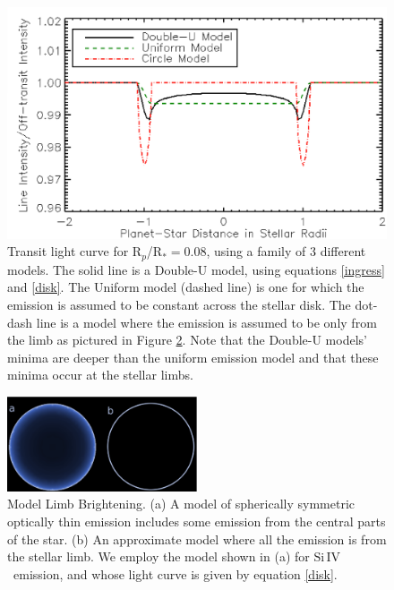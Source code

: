 \documentclass[manuscript]{aastex}
\newcommand{\siIV}{\ensuremath{\mathrm{Si}\,\scriptstyle \mathrm{IV}}}
\newcommand{\p}{R$_p$/R$_*$}
\begin{document}
\begin{figure}
\includegraphics[width=0.5 \textwidth]{model_compare2.eps}
\caption{Transit light curve for \p $=0.08$, using a family of 3 different models. The solid line is a Double-U model, using equations \ref{ingress} and \ref{disk}. The Uniform model (dashed line) is one for which the emission is assumed to be constant across the stellar disk. The dot-dash line is a model where the emission is assumed to be only from the limb as pictured in Figure \ref{limbmodel}. Note that the Double-U models' minima are deeper than the uniform emission model and that these minima occur at the stellar limbs. }
\label{fig02}
\end{figure}


\begin{figure}
\begin{center}
\includegraphics[width=0.5\textwidth]{model_comparison.eps}
\caption{Model Limb Brightening. (a) A model of spherically symmetric optically thin emission includes some emission from the central parts of the star. (b) An approximate model where all the emission is from the stellar limb. We employ the model shown in (a) for \siIV\ emission, and whose light curve is given by  equation \ref{disk}.}
\label{limbmodel}
\end{center}
\end{figure}
\end{document}
